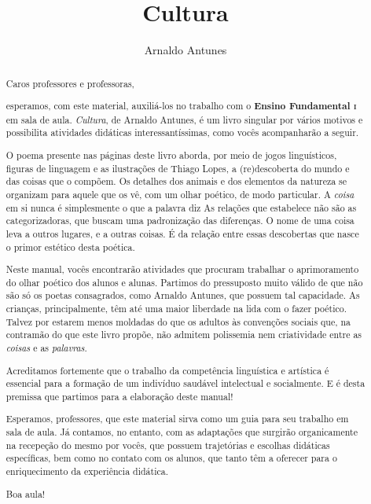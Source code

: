 \documentclass[11pt]{extarticle}
\newcommand{\AutorLivro}{Arnaldo Antunes}
\newcommand{\TituloLivro}{Cultura}
\newcommand{\colaborador}{Renier Silva}
\begin{document}
\title{\TituloLivro}
\author{\AutorLivro}
\def\authornotes{\colaborador}

\date{}
\maketitle

\tableofcontents


\begin{abstract}

Caros professores e professoras,

esperamos, com este material,
auxiliá-los no trabalho com o \textbf{Ensino Fundamental \textsc{i}} em 
sala de aula. \textit{Cultura}, de Arnaldo Antunes, é um livro singular
por vários motivos e possibilita atividades didáticas interessantíssimas,
como vocês acompanharão a seguir.

O poema presente nas páginas deste livro aborda, por meio de jogos linguísticos,
figuras de linguagem e as ilustrações de Thiago Lopes, 
a (re)descoberta do mundo e das coisas que o compõem. 
Os detalhes dos animais e dos elementos da natureza se organizam
para aquele que os vê, com um olhar poético, de modo particular. 
A \textit{coisa} em si nunca é simplesmente o que a palavra diz
As relações que estabelece não são as categorizadoras, que
buscam uma padronização das diferenças.
O nome de uma coisa leva a outros lugares, e a outras coisas.
É da relação entre essas descobertas que nasce o primor estético
desta poética. 

Neste manual, vocês encontrarão atividades que procuram 
trabalhar o aprimoramento do olhar poético dos alunos e alunas. 
Partimos do pressuposto muito válido de que não são só os poetas 
consagrados, como Arnaldo Antunes, que possuem tal capacidade. 
As crianças, principalmente, têm até 
uma maior liberdade na lida com o fazer poético. 
Talvez por estarem menos moldadas do que os adultos 
às convenções sociais que, na contramão do que este livro propõe,
não admitem polissemia nem criatividade entre as \textit{coisas}
e as \textit{palavras}. 

Acreditamos fortemente que o trabalho da competência linguística
e artística é essencial para a formação de um indivíduo saudável 
intelectual e socialmente. E é desta premissa que partimos para
a elaboração deste manual!

Esperamos, professores, que este material sirva como um guia 
para seu trabalho em sala de aula. Já contamos, no entanto, com as adaptações
que surgirão organicamente na recepeção do mesmo por vocês, que possuem 
trajetórias e escolhas didáticas específicas, bem como no contato com os 
alunos, que tanto têm a oferecer para o enriquecimento da experiência didática.

Boa aula!

\end{abstract}
\end{document}
